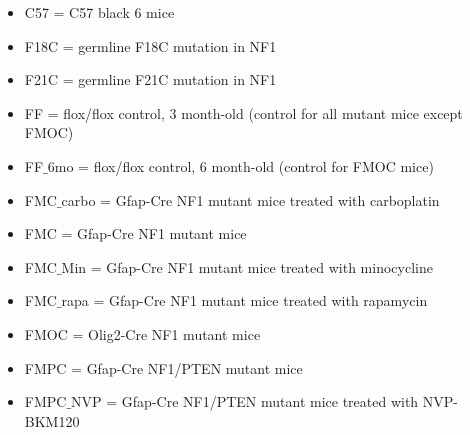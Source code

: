 \documentclass{article}\usepackage[]{graphicx}\usepackage[]{color}
\begin{document}
\begin{itemize}
\item C57 = C57 black 6 mice
\item F18C = germline F18C mutation in NF1
\item F21C = germline F21C mutation in NF1
\item FF = flox/flox control, 3 month-old (control for all mutant mice except FMOC)
\item FF$\_$6mo = flox/flox control, 6 month-old (control for FMOC mice)
\item FMC$\_$carbo = Gfap-Cre NF1 mutant mice treated with carboplatin
\item FMC = Gfap-Cre NF1 mutant mice
\item FMC$\_$Min = Gfap-Cre NF1 mutant mice treated with minocycline
\item FMC$\_$rapa = Gfap-Cre NF1 mutant mice treated with rapamycin
\item FMOC = Olig2-Cre NF1 mutant mice
\item FMPC = Gfap-Cre NF1/PTEN mutant mice
\item FMPC$\_$NVP = Gfap-Cre NF1/PTEN mutant mice treated with NVP-BKM120
\end{itemize}
\end{document}
